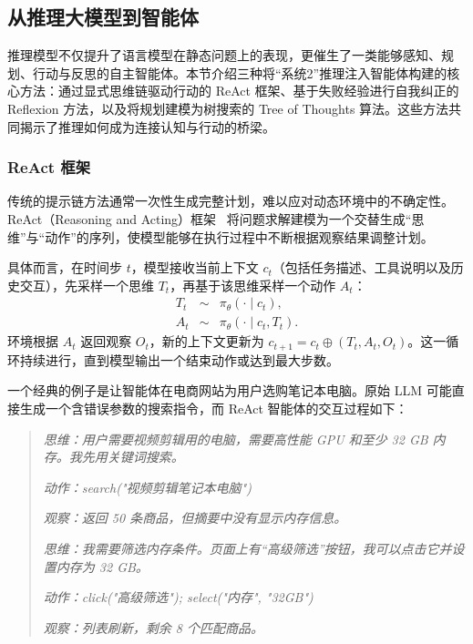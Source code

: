 \subsection{从推理大模型到智能体}

推理模型不仅提升了语言模型在静态问题上的表现，更催生了一类能够感知、规划、行动与反思的自主智能体。本节介绍三种将“系统2”推理注入智能体构建的核心方法：通过显式思维链驱动行动的 ReAct 框架、基于失败经验进行自我纠正的 Reflexion 方法，以及将规划建模为树搜索的 Tree of Thoughts 算法。这些方法共同揭示了推理如何成为连接认知与行动的桥梁。

\subsubsection{ReAct 框架}

传统的提示链方法通常一次性生成完整计划，难以应对动态环境中的不确定性。ReAct（Reasoning and Acting）框架~\cite{yao-etal:2023react} 将问题求解建模为一个交替生成“思维”与“动作”的序列，使模型能够在执行过程中不断根据观察结果调整计划。

具体而言，在时间步 $t$，模型接收当前上下文 $c_t$（包括任务描述、工具说明以及历史交互），先采样一个思维 $T_t$，再基于该思维采样一个动作 $A_t$：
\begin{eqnarray}
T_t &\sim& \pi_\theta(\cdot \mid c_t), \\
A_t &\sim& \pi_\theta(\cdot \mid c_t, T_t).
\end{eqnarray}
环境根据 $A_t$ 返回观察 $O_t$，新的上下文更新为 $c_{t+1} = c_t \oplus (T_t, A_t, O_t)$。这一循环持续进行，直到模型输出一个结束动作或达到最大步数。

一个经典的例子是让智能体在电商网站为用户选购笔记本电脑。原始 LLM 可能直接生成一个含错误参数的搜索指令，而 ReAct 智能体的交互过程如下：

\vspace{0.5em}
\begin{quote}
\textit{思维：用户需要视频剪辑用的电脑，需要高性能 GPU 和至少 32 GB 内存。我先用关键词搜索。}

\textit{动作：search("视频剪辑笔记本电脑")}

\textit{观察：返回 50 条商品，但摘要中没有显示内存信息。}

\textit{思维：我需要筛选内存条件。页面上有“高级筛选”按钮，我可以点击它并设置内存为 32 GB。}

\textit{动作：click("高级筛选"); select("内存", "32GB")}

\textit{观察：列表刷新，剩余 8 个匹配商品。}
\end{quote}
\vspace{0.5em}

